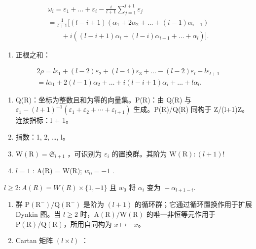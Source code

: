 \[
\begin{array}{l} \omega_ {i} = \varepsilon_ {1} + \dots + \varepsilon_ {i} - \frac {i}{l + 1} \sum_ {j = 1} ^ {l + 1} \varepsilon_ {j} \\ = \frac {1}{l + 1} [ (l - i + 1) (\alpha_ {1} + 2 \alpha_ {2} + \dots + (i - 1) \alpha_ {i - 1}) \\ \qquad + i ((l - i + 1) \alpha_ {i} + (l - i) \alpha_ {i + 1} + \dots + \alpha_ {l}) ]. \end{array}
\]

\begin{enumerate}
\def\labelenumi{(\Roman{enumi})}
\setcounter{enumi}{6}
\tightlist
\item
  正根之和：
\end{enumerate}

\[
\begin{array}{c} 2 \rho = l \varepsilon_ {1} + (l - 2) \varepsilon_ {2} + (l - 4) \varepsilon_ {3} + \dots - (l - 2) \varepsilon_ {l} - l \varepsilon_ {l + 1} \\ = l \alpha_ {1} + 2 (l - 1) \alpha_ {2} + \dots + i (l - i + 1) \alpha_ {i} + \dots + l \alpha_ {l}. \end{array}
\]

\begin{enumerate}
\def\labelenumi{(\Roman{enumi})}
\setcounter{enumi}{7}
\item
  Q(R)：坐标为整数且和为零的向量集。P(R)：由 Q(R) 与 \(\varepsilon_{1} - (l + 1)^{-1}(\varepsilon_{1} + \varepsilon_{2} + \cdots + \varepsilon_{l+1})\) 生成。P(R)/Q(R) 同构于 Z/(l+1)Z。连接指标：l + 1。
\item
  指数：1, 2, \ldots, l。
\item
  \(\mathrm{W}(\mathrm{R}) = \mathfrak{S}_{l + 1}\) ，可识别为 \(\varepsilon_{i}\) 的置换群。其阶为 \(\mathrm{W}(\mathrm{R})\colon (l + 1)!\)
\item
  \(l = 1\) : A(R) = W(R); \(w_0 = -1\) .
\end{enumerate}

\(l \geqslant 2: A(R) = W(R) \times \{1, -1\} \text{ 且 } w_{0} \text{ 将 } \alpha_{i} \text{ 变为 } -\alpha_{l+1-i}.\)

\begin{enumerate}
\def\labelenumi{(\Roman{enumi})}
\setcounter{enumi}{11}
\item
  群 \(\mathrm{P}(\mathrm{R}^{-})/\mathrm{Q}(\mathrm{R}^{-})\) 是阶为 \((l+1)\) 的循环群；它通过循环置换作用于扩展 Dynkin 图。当 \(l \geqslant 2\) 时，\(\mathrm{A}(\mathrm{R})/\mathrm{W}(\mathrm{R})\) 的唯一非恒等元作用于 \(\mathrm{P}(\mathrm{R})/\mathrm{Q}(\mathrm{R})\)，所用自同构为 \(x \mapsto -x\)。
\item
  Cartan 矩阵 \((l \times l)\) ：
\end{enumerate}

